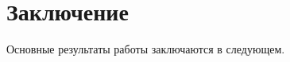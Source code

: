 \chapter*{Заключение}                       %


Основные результаты работы заключаются в следующем.

%
